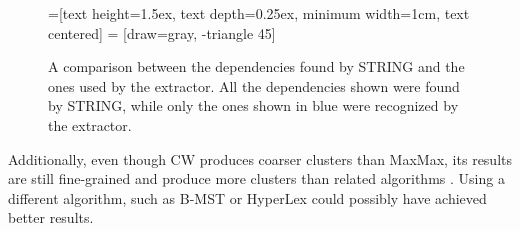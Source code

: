 \begin{figure}[ht]
\caption[Dependencies found by \acs*{STRING} and the extractor]{A comparison between
the dependencies found by STRING and the ones used by the extractor. All the
dependencies shown were found by \ac{STRING}, while only the ones shown in blue
were recognized by the extractor.}
\label{fig:extractor}
\centering
{}=[text height=1.5ex, text depth=0.25ex,
                        minimum width=1cm, text centered]
 = [draw=gray, -triangle 45]
\end{figure}

Additionally, even though \ac{CW} produces coarser clusters than MaxMax, its
results are still fine-grained and produce more clusters than related algorithms
\citep{marco2013clustering}. Using a different algorithm, such as \ac{B-MST}
\citep{marco2013clustering} or HyperLex \citep{veronis2004hyperlex} could 
possibly
have achieved better results.

